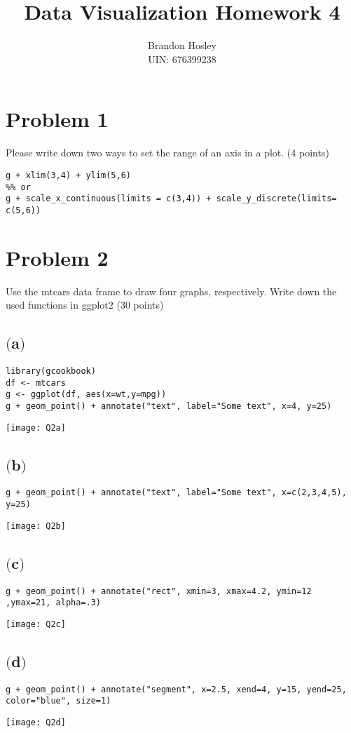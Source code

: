 \documentclass[a4paper,man,natbib]{apa6}
\title{Data Visualization Homework 4}
\author{Brandon Hosley \\ UIN: 676399238}
\date{}
\affiliation{Yanhui Guo, Ph.D}
\begin{document}
\maketitle
\singlespacing
\raggedbottom
	
\section{Problem 1}
Please write down two ways to set the range of an axis in a plot. (4 points)
\begin{verbatim}
g + xlim(3,4) + ylim(5,6)
%% or
g + scale_x_continuous(limits = c(3,4)) + scale_y_discrete(limits= c(5,6))
\end{verbatim}

\section{Problem 2}
Use the mtcars data frame to draw four graphs, respectively.  Write down the used functions in ggplot2 (30 points)

\subsection{$($a$)$}
\begin{verbatim}
library(gcookbook)
df <- mtcars
g <- ggplot(df, aes(x=wt,y=mpg))
g + geom_point() + annotate("text", label="Some text", x=4, y=25)
\end{verbatim}
\texttt{[image: Q2a]}

\subsection{$($b$)$}
\begin{verbatim}
g + geom_point() + annotate("text", label="Some text", x=c(2,3,4,5), y=25)
\end{verbatim}
\texttt{[image: Q2b]}

\subsection{$($c$)$}
\begin{verbatim}
g + geom_point() + annotate("rect", xmin=3, xmax=4.2, ymin=12 ,ymax=21, alpha=.3)
\end{verbatim}
\texttt{[image: Q2c]}

\subsection{$($d$)$}
\begin{verbatim}
g + geom_point() + annotate("segment", x=2.5, xend=4, y=15, yend=25, color="blue", size=1)
\end{verbatim}
\texttt{[image: Q2d]}
\end{document}
